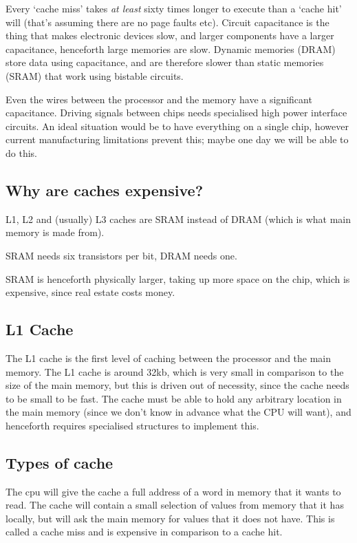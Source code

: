Every `cache miss' takes \textit{at least} sixty times longer to execute than a
`cache hit' will (that's assuming there are no page faults etc). Circuit
capacitance is the thing that makes electronic devices slow, and larger
components have a larger capacitance, henceforth large memories are slow.
Dynamic memories (DRAM) store data using capacitance, and are therefore slower
than static memories (SRAM) that work using bistable circuits.

Even the wires between the processor and the memory have a significant
capacitance. Driving signals between chips needs specialised high power
interface circuits. An ideal situation would be to have everything on a single
chip, however current manufacturing limitations prevent this; maybe one day we
will be able to do this.


\subsection{Why are caches expensive?}

L1, L2 and (usually) L3 caches are SRAM instead of DRAM (which is what main
memory is made from).

SRAM needs six transistors per bit, DRAM needs one.

SRAM is henceforth physically larger, taking up more space on the chip, which is
expensive, since real estate costs money.


\subsection{L1 Cache}

The L1 cache is the first level of caching between the processor and the main
memory. The L1 cache is around 32kb, which is very small in comparison to the
size of the main memory, but this is driven out of necessity, since the cache
needs to be small to be fast. The cache must be able to hold any arbitrary
location in the main memory (since we don't know in advance what the CPU will
want), and henceforth requires specialised structures to implement this.


\subsection{Types of cache}

The cpu will give the cache a full address of a word in memory that it wants to
read. The cache will contain a small selection of values from memory that it has
locally, but will ask the main memory for values that it does not have. This is
called a cache miss and is expensive in comparison to a cache hit.

